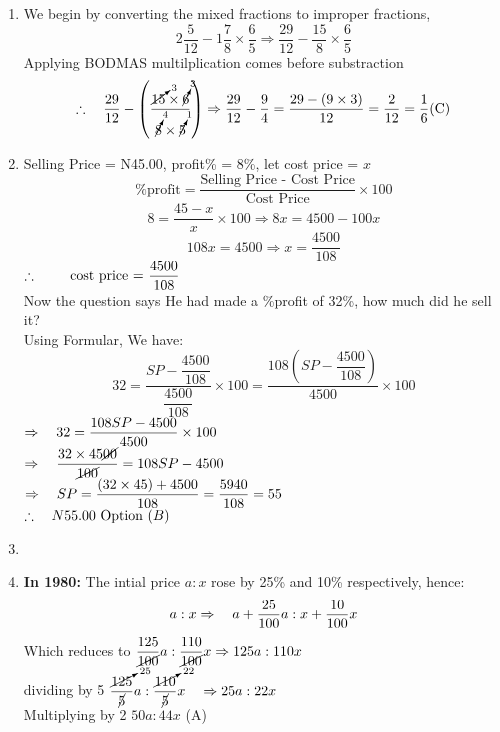 \begin{multicols}{2}
\begin{enumerate}[label={\arabic*.}]
\item We begin by converting the mixed fractions to improper fractions,
    \[2\frac{5}{12} - 1\frac{7}{8} \times \frac{6}{5} \Rightarrow \frac{29}{12} - \frac{15}{8} \times \frac{6}{5}\]
    Applying BODMAS multilplication comes before substraction\\
    \[\therefore \hspace{10px} \dfrac{29}{12} - \left(\dfrac{\cancelto{3}{15} \times \cancelto{3}{6}}{\cancelto{4}{8} \times \cancelto{1}{5}}\right) \Rightarrow \dfrac{29}{12} - \dfrac{9}{4} = \dfrac{29 - (9 \times 3)}{12} = \frac{2}{12} = \frac{1}{6} \text{(C)}\]

    \item Selling Price = N45.00, profit\% = 8\%, let cost price = \(x\)
    \[ \%\text{profit} = \frac{\text{Selling Price - Cost Price} }{\text{Cost Price}} \times 100 \]
       \[8 = \frac{45 - x }{x} \times 100 \Rightarrow 8x = 4500 -100x\]
       \[108x = 4500 \Rightarrow x = \dfrac{4500}{108}  \]
       \(\therefore \hspace{20px} \text{ cost price = }\dfrac{4500}{108}\) \\
       Now the question says He had made a \%profit of 32\%, how much did he sell it? \\
       Using Formular, We have: 
       \[32 = \frac{SP - \dfrac{4500}{108}}{\dfrac{4500}{108}} \times 100 =  \frac{108\left(SP - \dfrac{4500}{108}\right)}{4500} \times 100\]
       \(\Rightarrow \hspace {10px} 32 =  \dfrac{108SP - 4500}{4500} \times 100 \) \\
       \(\Rightarrow \hspace{10px} \dfrac{32 \times 45\cancel{00}}{\cancel{100}} = 108SP - 4500\) \\
       \(\Rightarrow  \hspace{10px} SP = \dfrac{\left(32 \times 45\right) + 4500}{108} = \dfrac{5940}{108} = 55\) \vspace{5px}\\
       \(\therefore \hspace{10px} N55.00 \text{ Option } (B)\)

    \item 

 \item \textbf{In 1980:} The intial price \(a : x\) rose by 25\% and 10\% respectively, hence:
    \[a:x \Rightarrow \hspace{10px} a + \dfrac{25}{100}a : x + \dfrac{10}{100}x\]
    Which reduces to \(\dfrac{125}{\cancel{100}}a : \dfrac{110}{\cancel{100}}x \Rightarrow {125}a : 110x  \) \vspace{5px} \\
    dividing by 5 \(\dfrac{\cancelto{25}{125}}{\cancel{5}} a : \dfrac{\cancelto{22}{110}}{\cancel{5}} x \hspace {10px}\Rightarrow 25a : 22x \) \vspace{5px}\\
    Multiplying by 2 \hspace{10px} \(50a : 44x\) \hspace{5px} (A)


\end{enumerate}
\end{multicols}
